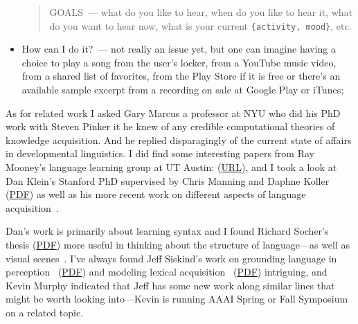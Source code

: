 \documentclass[letterpaper,11pt]{article}
\begin{document}
\begin{itemize}
%
  \begin{quotation}
%
    \noindent
    GOALS~--- what do you like to hear, when do you like to hear it, what do you want to hear now, what is your current {\tt{\{activity, mood\}}}, etc.\\
%
\end{quotation}
%
\item How can I do it?~--- not really an issue yet, but one can imagine having a choice to play a song from the user's locker, from a YouTube music video, from a shared list of favorites, from the Play Store if it is free or there's an available sample excerpt from a recording on sale at Google Play or iTunes;
%
\end{itemize}

As for related work I asked Gary Marcus a professor at NYU who did his PhD work with Steven Pinker it he knew of any credible computational theories of knowledge acquisition. And he replied disparagingly of the current state of affairs in developmental linguistics. I did find some interesting papers from Ray Mooney’s language learning group at UT Austin: (\href{http://www.cs.utexas.edu/~ml/publications/area/78/natural_language_learning}{URL}), and I took a look at Dan Klein’s Stanford PhD supervised by Chris Manning and Daphne Koller (\href{http://www.cs.berkeley.edu/~klein/papers/klein_thesis.pdf}{PDF}) as well as his more recent work on different aspects of language acquisition~\cite{LiangetalCL-13,GuadarramaetalICRAS-13,LangACL-09}.

Dan's work is primarily about learning syntax and I found Richard Socher's thesis (\href{http://nlp.stanford.edu/~socherr/thesis.pdf}{PDF}) more useful in thinking about the structure of language---as well as visual scenes~\cite{SocheretalACL-13,SocheretalNIPS-11,SocheretalEMNLP-12,SocheretalEMNLP-13}. I've always found Jeff Siskind's work on grounding language in perception~\cite{SiskindCOGNITION-96} (\href{https://engineering.purdue.edu/~qobi/papers/aireview1995.pdf}{PDF}) and modeling lexical acquisition~\cite{SiskindAIR-95} (\href{https://engineering.purdue.edu/~qobi/papers/cognition1996.pdf}{PDF}) intriguing, and Kevin Murphy indicated that Jeff has some new work along similar lines that might be worth looking into---Kevin is running AAAI Spring or Fall Symposium on a related topic. 
\end{document}
